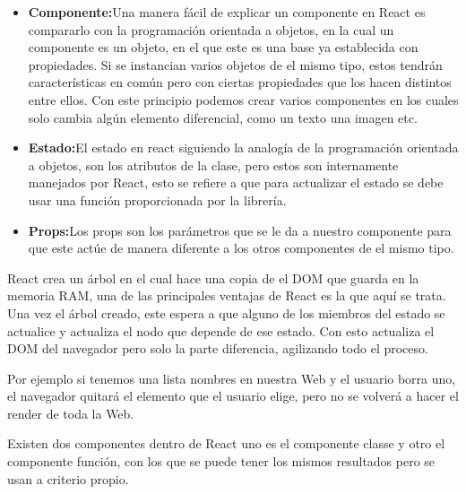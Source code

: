 \begin{itemize}
\begin{itemize}
 
 \item \textbf{Componente:}Una manera fácil de explicar un componente en React es compararlo con la programación orientada a objetos, en la cual un componente es un objeto, en el que este es una base ya establecida con propiedades. Si se instancian varios objetos de el mismo tipo, estos tendrán características en común pero con ciertas propiedades que los hacen distintos entre ellos. Con este principio podemos crear varios componentes en los cuales solo cambia algún elemento diferencial, como un texto una imagen etc.
  \item \textbf{Estado:}El estado en react siguiendo la analogía de la programación orientada a objetos, son los atributos de la clase, pero estos son internamente manejados por React, esto se refiere a que para actualizar el estado se debe usar una función proporcionada por la librería.
   \item \textbf{Props:}Los props son los parámetros  que se le da a nuestro componente para que este actúe de manera diferente a los otros componentes de el mismo tipo.
 \end{itemize}
 React crea un árbol en el cual hace una copia de el DOM que guarda en la memoria RAM, una de las principales ventajas de React es la que aquí se trata. Una vez el árbol creado, este espera a que alguno de los miembros del estado se actualice y actualiza el nodo que depende de ese estado. Con esto actualiza el DOM del navegador pero solo la parte diferencia, agilizando todo el proceso.

Por ejemplo si tenemos una lista nombres en nuestra Web y el usuario borra uno, el navegador quitará el elemento que el usuario elige, pero no se volverá a hacer el render de toda la Web.

Existen dos componentes dentro de React uno es el componente classe y otro el componente función, con los que se puede tener los mismos resultados pero se usan a criterio propio.


\end{itemize}
